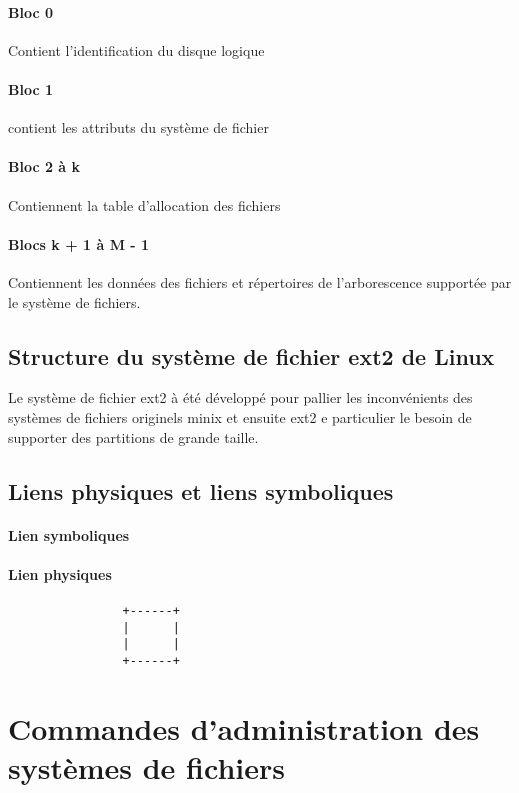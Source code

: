 \documentclass[12pt,a4paper,openany]{book}
\begin{document}
			\paragraph{Bloc 0} Contient l'identification du disque logique
			\paragraph{Bloc 1} contient les attributs du système de fichier
			\paragraph{Bloc 2 à k} Contiennent la table d'allocation des fichiers
			\paragraph{Blocs k + 1 à M - 1} Contiennent les données des fichiers
				et répertoires de l'arborescence supportée par le système de fichiers.

		\subsection{Structure du système de fichier ext2 de Linux}
		Le système de fichier ext2 à été développé pour pallier les inconvénients
		des systèmes de fichiers originels minix et ensuite ext2 e particulier le 
		besoin de supporter des partitions de grande taille.
		\subsection{Liens physiques et liens symboliques}
		\paragraph{Lien symboliques}
			
		\paragraph{Lien physiques}
			\begin{verbatim}
				+------+
				|      |  
				|      |
				+------+
			\end{verbatim}
	\section{Commandes d'administration des systèmes de fichiers}
\end{document}

